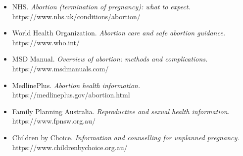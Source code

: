 \begin{itemize}
    \item NHS. \textit{Abortion (termination of pregnancy): what to expect.} https://www.nhs.uk/conditions/abortion/
    \item World Health Organization. \textit{Abortion care and safe abortion guidance.} https://www.who.int/
    \item MSD Manual. \textit{Overview of abortion: methods and complications.} https://www.msdmanuals.com/
    \item MedlinePlus. \textit{Abortion health information.} https://medlineplus.gov/abortion.html
    \item Family Planning Australia. \textit{Reproductive and sexual health information.} https://www.fpnsw.org.au/
    \item Children by Choice. \textit{Information and counselling for unplanned pregnancy.} https://www.childrenbychoice.org.au/
\end{itemize}
